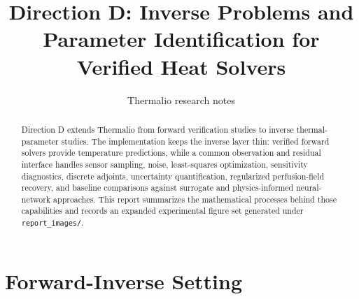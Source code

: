 \documentclass[11pt]{article}
\title{Direction D: Inverse Problems and Parameter Identification for Verified Heat Solvers}
\author{Thermalio research notes}
\date{}
\numberwithin{equation}{section}
\begin{document}
\maketitle

\begin{abstract}
Direction D extends Thermalio from forward verification studies to inverse
thermal-parameter studies.  The implementation keeps the inverse layer thin:
verified forward solvers provide temperature predictions, while a common
observation and residual interface handles sensor sampling, noise, least-squares
optimization, sensitivity diagnostics, discrete adjoints, uncertainty
quantification, regularized perfusion-field recovery, and baseline comparisons
against surrogate and physics-informed neural-network approaches.  This report
summarizes the mathematical processes behind those capabilities and records an
expanded experimental figure set generated under \texttt{report\_images/}.
\end{abstract}

\section{Forward-Inverse Setting}
\end{document}
